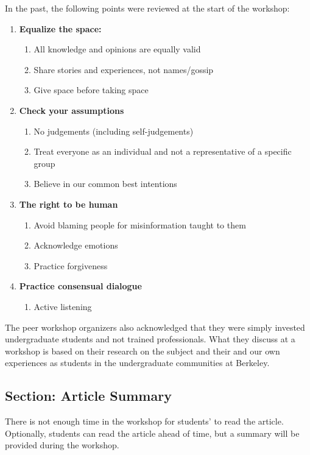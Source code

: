 \documentclass[addpoints,12pt]{exam}
\numberwithin{equation}{section}
\begin{document}
	In the past, the following points were reviewed at the start of the workshop:
	\begin{enumerate}
		\item\textbf{ Equalize the space:}
		\begin{enumerate}
			\item All knowledge and opinions are equally valid
			\item Share stories and experiences, not names/gossip
			\item Give space before taking space
		\end{enumerate}
		\item \textbf{Check your assumptions}
		\begin{enumerate}
			\item No judgements (including self-judgements)
			\item Treat everyone as an individual and not a representative of a specific group
			\item Believe in our common best intentions
		\end{enumerate}
		\item \textbf{The right to be human}
		\begin{enumerate}
			\item Avoid blaming people for misinformation taught to them
			\item Acknowledge emotions
			\item Practice forgiveness
		\end{enumerate}
		\item \textbf{Practice consensual dialogue}
		\begin{enumerate}
			\item Active listening
		\end{enumerate}
	\end{enumerate}
	
	The peer workshop organizers also acknowledged that they were simply invested undergraduate students and not trained professionals. What they discuss at a workshop is based on their research on the subject and their and our own experiences as students in the undergraduate communities at Berkeley.
		
	\subsection{Section: Article Summary}

	There is not enough time in the workshop for students' to read the article. Optionally, students can read the article ahead of time, but a summary will be provided during the workshop.
\end{document}
